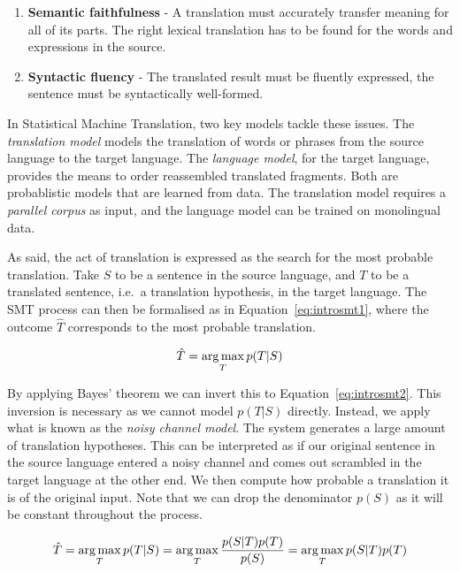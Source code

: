 \begin{enumerate}
	\item \textbf{Semantic faithfulness} - A translation must accurately transfer meaning for all of its parts. The right lexical translation has to be found for the words and expressions in the source.
	\item \textbf{Syntactic fluency} - The translated result must be fluently
        expressed, the sentence must be syntactically well-formed.
\end{enumerate}

In Statistical Machine Translation, two key models tackle these issues. The
\emph{translation model} models the translation of words or phrases from the
source language to the target language. The \emph{language model}, for the
target language, provides the means to order reassembled translated fragments. Both
are probablistic models that are learned from data. The translation model
requires a \emph{parallel corpus} as input, and the language model can be
trained on monolingual data.

As said, the act of translation is expressed as the search for the most
probable translation. Take $S$ to be a sentence in the source language, and $T$
to be a translated sentence, i.e.\ a translation hypothesis, in the target
language. The SMT process can then be formalised as in
Equation~\ref{eq:introsmt1}, where the outcome $\hat{T}$ corresponds to the most probable translation.

\begin{equation}
\hat{T} = \operatorname*{arg\,max}_T p(T|S)
\label{eq:introsmt1}
\end{equation}

By applying Bayes' theorem we can invert this to Equation~\ref{eq:introsmt2}.
This inversion is necessary as we cannot model $p(T|S)$ directly. Instead, we
apply what is known as the \emph{noisy channel model}. The system generates a
large amount of translation hypotheses. This can be interpreted as if our
original sentence in the source language entered a noisy channel and comes out
scrambled in the target language at the other end. We then compute how probable
a translation it is of the original input. Note that we can drop the
denominator $p(S)$ as it will be constant throughout the process.

\begin{equation}
\hat{T} = \operatorname*{arg\,max}_T p(T|S) = \operatorname*{arg\,max}_T \frac{p(S|T)p(T)}{p(S)} = \operatorname*{arg\,max}_T p(S|T)p(T)
\label{eq:introsmt2}
\end{equation}


